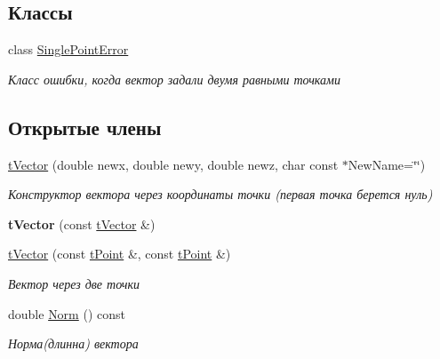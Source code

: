 \subsection*{Классы}
\begin{DoxyCompactItemize}
\item 
class \hyperlink{classtVector_1_1SinglePointError}{Single\+Point\+Error}
\begin{DoxyCompactList}\small\item\em Класс ошибки, когда вектор задали двумя равными точками \end{DoxyCompactList}\end{DoxyCompactItemize}
\subsection*{Открытые члены}
\begin{DoxyCompactItemize}
\item 
\mbox{\label{classtVector_ad9dab835ddc33066445f3a00b77a0965}} 
\hyperlink{classtVector_ad9dab835ddc33066445f3a00b77a0965}{t\+Vector} (double newx, double newy, double newz, char const $\ast$New\+Name=\char`\"{}\char`\"{})
\begin{DoxyCompactList}\small\item\em Конструктор вектора через координаты точки (первая точка берется нуль) \end{DoxyCompactList}\item 
\mbox{\label{classtVector_aed3e3026b2483d748d4652cd3e79296d}} 
{\bfseries t\+Vector} (const \hyperlink{classtVector}{t\+Vector} \&)
\item 
\mbox{\label{classtVector_a7dbffa8e340348bc896c578fd0335364}} 
\hyperlink{classtVector_a7dbffa8e340348bc896c578fd0335364}{t\+Vector} (const \hyperlink{classtPoint}{t\+Point} \&, const \hyperlink{classtPoint}{t\+Point} \&)
\begin{DoxyCompactList}\small\item\em Вектор через две точки \end{DoxyCompactList}\item 
\mbox{\label{classtVector_a6573fc24ec1bfa80c6a5e21c1ea8be62}} 
double \hyperlink{classtVector_a6573fc24ec1bfa80c6a5e21c1ea8be62}{Norm} () const
\begin{DoxyCompactList}\small\item\em Норма(длинна) вектора \end{DoxyCompactList}\item 

\end{DoxyCompactItemize}
